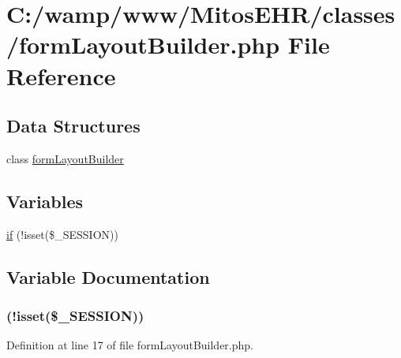 \hypertarget{form_layout_builder_8php}{\section{\-C\-:/wamp/www/\-Mitos\-E\-H\-R/classes/form\-Layout\-Builder.php \-File \-Reference}
\label{form_layout_builder_8php}
}
\subsection*{\-Data \-Structures}
\begin{DoxyCompactItemize}
\item 
class \hyperlink{classform_layout_builder}{form\-Layout\-Builder}
\end{DoxyCompactItemize}
\subsection*{\-Variables}
\begin{DoxyCompactItemize}
\item 
\hyperlink{form_layout_builder_8php_a8ceca98aa29914fd2479a84a8d2242fb}{if} (!isset(\$\-\_\-\-S\-E\-S\-S\-I\-O\-N))
\end{DoxyCompactItemize}


\subsection{\-Variable \-Documentation}
\hypertarget{form_layout_builder_8php_a8ceca98aa29914fd2479a84a8d2242fb}{
\subsubsection[{if}]{(!isset(\$\-\_\-\-S\-E\-S\-S\-I\-O\-N))}}\label{form_layout_builder_8php_a8ceca98aa29914fd2479a84a8d2242fb}


\-Definition at line 17 of file form\-Layout\-Builder.\-php.

